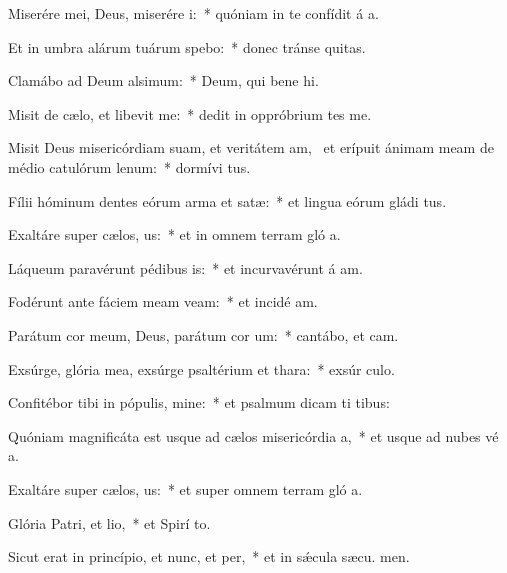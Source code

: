 \item Miserére mei, Deus, miserére i:~* quóniam in te confídit á a.
\item Et in umbra alárum tuárum spebo:~* donec tránse quitas.
\item Clamábo ad Deum alsimum:~* Deum, qui bene hi.
\item Misit de cælo, et libevit me:~* dedit in oppróbrium tes me.
\item Misit Deus misericórdiam suam, et veritátem am,~\pscross{} et erípuit ánimam meam de médio catulórum lenum:~* dormívi tus.
\item Fílii hóminum dentes eórum arma et satæ:~* et lingua eórum gládi tus.
\item Exaltáre super cælos, us:~* et in omnem terram gló a.
\item Láqueum paravérunt pédibus is:~* et incurvavérunt á am.
\item Fodérunt ante fáciem meam veam:~* et incidé  am.
\item Parátum cor meum, Deus, parátum cor um:~* cantábo, et  cam.
\item Exsúrge, glória mea, exsúrge psaltérium et thara:~* exsúr culo.
\item Confitébor tibi in pópulis, mine:~* et psalmum dicam ti  tibus:
\item Quóniam magnificáta est usque ad cælos misericórdia a,~* et usque ad nubes vé a.
\item Exaltáre super cælos, us:~* et super omnem terram gló a.
\item Glória Patri, et lio,~* et Spirí to.
\item Sicut erat in princípio, et nunc, et per,~* et in sǽcula sæcu. men.
